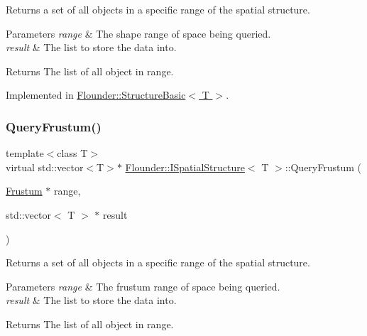 Returns a set of all objects in a specific range of the spatial structure. 


\begin{DoxyParams}{Parameters}
{\em range} & The shape range of space being queried. \\
\hline
{\em result} & The list to store the data into. \\
\hline
\end{DoxyParams}
\begin{DoxyReturn}{Returns}
The list of all object in range. 
\end{DoxyReturn}


Implemented in \hyperlink{class_flounder_1_1_structure_basic_aa0f666b4212caeafcee431376a7f25cd}{Flounder\+::\+Structure\+Basic$<$ T $>$}.

\mbox{\label{class_flounder_1_1_i_spatial_structure_a152be1fdfdc76866c1c18c4c2f72b09b}} 
\subsubsection{\texorpdfstring{Query\+Frustum()}{QueryFrustum()}}
{\footnotesize\ttfamily template$<$class T$>$ \\
virtual std\+::vector$<$T$>$$\ast$ \hyperlink{class_flounder_1_1_i_spatial_structure}{Flounder\+::\+I\+Spatial\+Structure}$<$ T $>$\+::Query\+Frustum (\begin{DoxyParamCaption}\item[{\hyperlink{class_flounder_1_1_frustum}{Frustum} $\ast$}]{range,  }\item[{std\+::vector$<$ T $>$ $\ast$}]{result }\end{DoxyParamCaption})\hspace{0.3cm}{\ttfamily [pure virtual]}}



Returns a set of all objects in a specific range of the spatial structure. 


\begin{DoxyParams}{Parameters}
{\em range} & The frustum range of space being queried. \\
\hline
{\em result} & The list to store the data into. \\
\hline
\end{DoxyParams}
\begin{DoxyReturn}{Returns}
The list of all object in range. 
\end{DoxyReturn}


